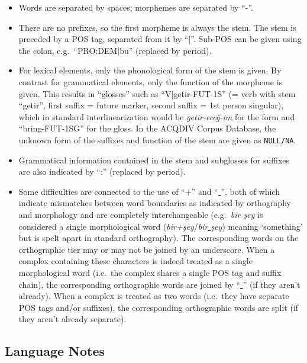 \documentclass[a4paper, 11pt]{book}
\newcommand{\und}{\underline{{ }}\hspace{0.2mm}}	%
\begin{document}
\begin{itemize}
	\item Words are separated by spaces; morphemes are separated by “-”. 
	\item There are no prefixes, so the first morpheme is always the stem. The stem is preceded by a POS tag, separated from it by “|”. 
		Sub-POS can be given using the colon, e.g.\ “PRO:DEM|bu” (replaced by period).
	\item For lexical elements, only the phonological form of the stem is given. By contrast for grammatical elements, only the function of the morpheme is given. 
		This results in “glosses” such as “V|getir-FUT-1S” (= verb with stem “getir”, first suffix = future marker, second suffix = 1st person singular), 
		which in standard interlinearization would be \emph{getir-eceğ-im} for the form and “bring-FUT-1SG” for the gloss. In the ACQDIV Corpus Database, the unknown
		form of the suffixes and function of the stem are given as \texttt{NULL/NA}.
	\item Grammatical information contained in the stem and subglosses for suffixes are also indicated by “:” (replaced by period). 
	\item Some difficulties are connected to the use of “+” and “\und”, both of which indicate mismatches between word boundaries as indicated by orthography
		and morphology and are completely interchangeable (e.g.\ \emph{bir şey} is considered a single morphological word (\emph{bir+şey}/\emph{bir\und şey})
		meaning ‘something’ but is spelt apart in standard orthography). The corresponding words on the orthographic tier may or may not be joined by
		an underscore. When a complex containing these characters is indeed treated as a single morphological word (i.e.\ the complex shares a single POS tag and suffix chain), 
		the corresponding orthographic words are joined by “\und” (if they aren’t already). When a complex is treated as two words (i.e.\ they have separate
		POS tags and/or suffixes), the corresponding orthographic words are split (if they aren’t already separate). 	
\end{itemize}


\subsection{Language Notes}
\end{document}
